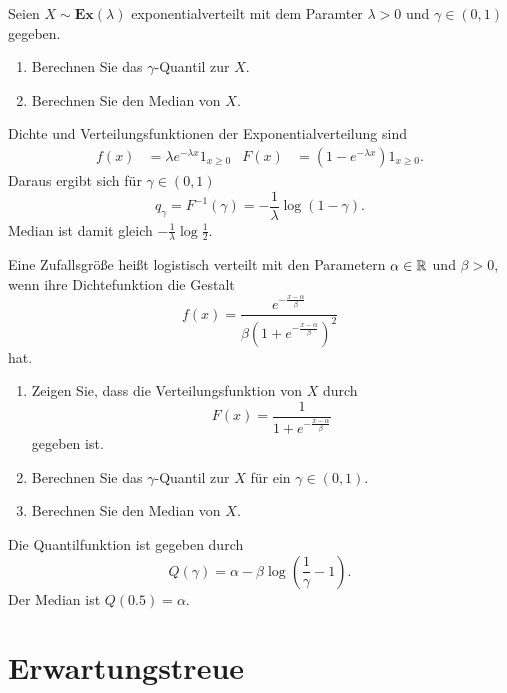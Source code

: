  Seien 
$X\sim \mathbf{Ex}(\lambda)$ exponentialverteilt mit dem Paramter $\lambda>0$
und $\gamma\in (0,1)$ gegeben. 
\begin{enumerate}
    \item Berechnen Sie das $\gamma$-Quantil zur $X$. 
    \item Berechnen Sie den Median von $X$. 
\end{enumerate}

\solution Dichte und Verteilungsfunktionen der Exponentialverteilung
sind
\begin{align*}
    f(x) &= \lambda e^{-\lambda x} 1_{x \geq 0} & F(x) &= \left( 1-e^{-\lambda x} \right)1_{x \geq 0}. 
\end{align*}
Daraus ergibt sich für $\gamma\in (0,1)$ 
\begin{equation*}
    q_{\gamma} = F^{-1}(\gamma) = -\frac{1}{\lambda} \log \left( 1-\gamma \right). 
\end{equation*}
Median ist damit gleich $-\frac{1}{\lambda} \log \frac{1}{2}$. 


 Eine Zufallsgröße heißt
logistisch verteilt mit den Parametern $\alpha\in\mathbb R$ und $\beta>0$, wenn ihre
Dichtefunktion die Gestalt
\begin{equation*}
    f(x) = \frac{e^{-\frac{x-\alpha}{\beta}}}
    {\beta\left( 1+e^{-\frac{x-\alpha}{\beta}} \right)^{2}}
\end{equation*}
hat.
\begin{enumerate}
    \item Zeigen Sie, dass die Verteilungsfunktion von $X$ durch
        \begin{equation*}
            F(x) = \frac{1}{1+e^{-\frac{x-\alpha}{\beta}}}
        \end{equation*}
        gegeben ist.

    \item Berechnen Sie das $\gamma$-Quantil zur $X$ für ein $\gamma\in (0,1)$. 
    \item Berechnen Sie den Median von $X$. 
\end{enumerate}

\solution Die Quantilfunktion ist gegeben durch
\begin{equation*}
    Q(\gamma) = \alpha - \beta \log\left( \frac{1}{\gamma} - 1 \right). 
\end{equation*}
Der Median ist $Q(0.5) = \alpha$.

\section{Erwartungstreue}

